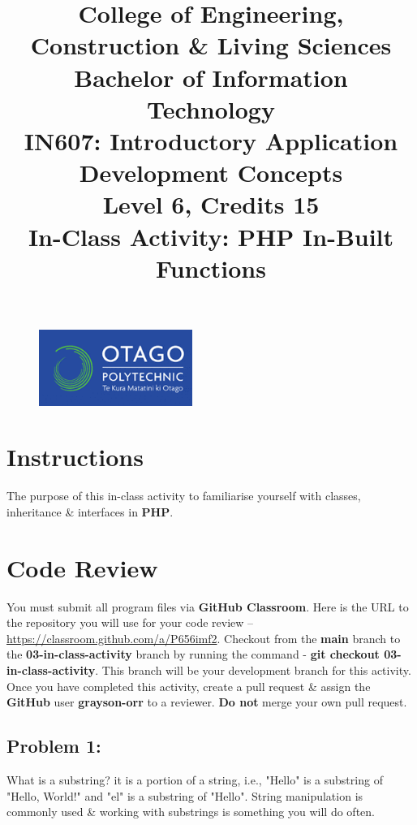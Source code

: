 \documentclass{article}
\author{}
\begin{document}
\begin{figure}
    \centering
    \includegraphics[width=50mm]{../img/logo.png}
\end{figure}

\title{College of Engineering, Construction \& Living Sciences\\Bachelor of Information Technology\\IN607: Introductory Application Development Concepts\\Level 6, Credits 15\\\textbf{In-Class Activity: PHP In-Built Functions}}
\date{}
\maketitle
 
\section*{Instructions}
The purpose of this in-class activity to familiarise yourself with classes, inheritance \& interfaces in \textbf{PHP}.

\section*{Code Review}
You must submit all program files via \textbf{GitHub Classroom}. Here is the URL to the repository you will use for your code review – \href{https://classroom.github.com/a/P656imf2}{https://classroom.github.com/a/P656imf2}. Checkout from the \textbf{main} branch to the \textbf{03-in-class-activity} branch by running the command - \textbf{git checkout 03-in-class-activity}. This branch will be your development branch for this activity. Once you have completed this activity, create a pull request \& assign the \textbf{GitHub} user \textbf{grayson-orr} to a reviewer. \textbf{Do not} merge your own pull request.

\subsection*{Problem 1:}
What is a substring? it is a portion of a string, i.e., "Hello" is a substring of "Hello, World!" and "el" is a substring of "Hello". String manipulation is commonly used \& working with substrings is something you will do often. \\
\end{document}
